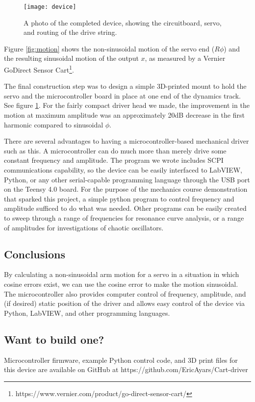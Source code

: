 \documentclass[11 pt]{article}
\begin{document}
\begin{figure}[ht]
	\begin{center}
		\texttt{[image: device]}
	\end{center}
	\caption{A photo of the completed device, showing the circuitboard, servo, and routing of the drive string.}
	\label{fig:device}
\end{figure}

Figure \ref{fig:motion} shows the non-sinusoidal motion of the servo end ($R\phi$) and the resulting sinusoidal motion of the output $x$, as measured by a Vernier GoDirect Sensor Cart\footnote{https://www.vernier.com/product/go-direct-sensor-cart/}.

The final construction step was to design a simple 3D-printed mount to hold the servo and the microcontroller board in place at one end of the dynamics track. 
See figure \ref{fig:device}.
For the fairly compact driver head we made, the improvement in the motion at maximum amplitude was an approximately 20dB decrease in the first harmonic compared to sinusoidal $\phi$.

There are several advantages to having a microcontroller-based mechanical driver such as this. 
A microcontroller can do much more than merely drive some constant frequency and amplitude. 
The program we wrote includes SCPI communications capability, so the device can be easily interfaced to LabVIEW, Python, or any other serial-capable programming language through the USB port on the Teensy 4.0 board.
For the purpose of the mechanics course demonstration that sparked this project, a simple python program to control frequency and amplitude sufficed to do what was needed. Other programs can be easily created to sweep through a range of frequencies for resonance curve analysis, or a range of amplitudes for investigations of chaotic oscillators.

\subsection*{Conclusions}
By calculating a non-sinusoidal arm motion for a servo in a situation in which cosine errors exist, we can use the cosine error to make the motion sinusoidal.
The microcontroller also provides computer control of frequency, amplitude, and (if desired) static position of the driver and allows easy control of the device via Python, LabVIEW, and other programming languages.

\subsection*{Want to build one?}
Microcontroller firmware, example Python control code, and 3D print files for this device are available on GitHub at https://github.com/EricAyars/Cart-driver
\end{document}
